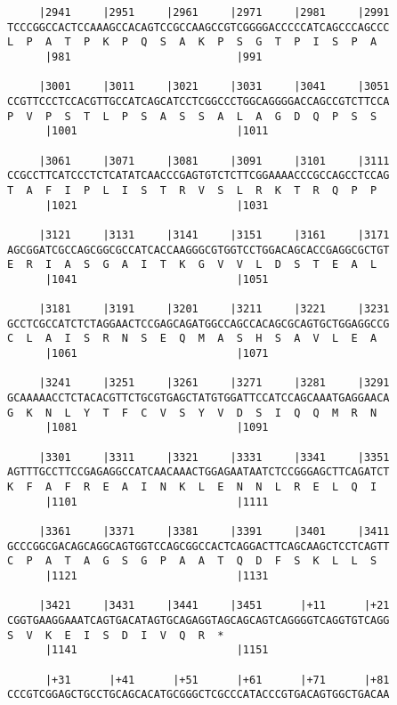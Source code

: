\documentclass{article}
\begin{document}
\begin{Verbatim}
     |2941     |2951     |2961     |2971     |2981     |2991
TCCCGGCCACTCCAAAGCCACAGTCCGCCAAGCCGTCGGGGACCCCCATCAGCCCAGCCC
L  P  A  T  P  K  P  Q  S  A  K  P  S  G  T  P  I  S  P  A  
      |981                          |991                    
  
     |3001     |3011     |3021     |3031     |3041     |3051
CCGTTCCCTCCACGTTGCCATCAGCATCCTCGGCCCTGGCAGGGGACCAGCCGTCTTCCA
P  V  P  S  T  L  P  S  A  S  S  A  L  A  G  D  Q  P  S  S  
      |1001                         |1011                   
  
     |3061     |3071     |3081     |3091     |3101     |3111
CCGCCTTCATCCCTCTCATATCAACCCGAGTGTCTCTTCGGAAAACCCGCCAGCCTCCAG
T  A  F  I  P  L  I  S  T  R  V  S  L  R  K  T  R  Q  P  P  
      |1021                         |1031                   
  
     |3121     |3131     |3141     |3151     |3161     |3171
AGCGGATCGCCAGCGGCGCCATCACCAAGGGCGTGGTCCTGGACAGCACCGAGGCGCTGT
E  R  I  A  S  G  A  I  T  K  G  V  V  L  D  S  T  E  A  L  
      |1041                         |1051                   
  
     |3181     |3191     |3201     |3211     |3221     |3231
GCCTCGCCATCTCTAGGAACTCCGAGCAGATGGCCAGCCACAGCGCAGTGCTGGAGGCCG
C  L  A  I  S  R  N  S  E  Q  M  A  S  H  S  A  V  L  E  A  
      |1061                         |1071                   
  
     |3241     |3251     |3261     |3271     |3281     |3291
GCAAAAACCTCTACACGTTCTGCGTGAGCTATGTGGATTCCATCCAGCAAATGAGGAACA
G  K  N  L  Y  T  F  C  V  S  Y  V  D  S  I  Q  Q  M  R  N  
      |1081                         |1091                   
  
     |3301     |3311     |3321     |3331     |3341     |3351
AGTTTGCCTTCCGAGAGGCCATCAACAAACTGGAGAATAATCTCCGGGAGCTTCAGATCT
K  F  A  F  R  E  A  I  N  K  L  E  N  N  L  R  E  L  Q  I  
      |1101                         |1111                   
  
     |3361     |3371     |3381     |3391     |3401     |3411
GCCCGGCGACAGCAGGCAGTGGTCCAGCGGCCACTCAGGACTTCAGCAAGCTCCTCAGTT
C  P  A  T  A  G  S  G  P  A  A  T  Q  D  F  S  K  L  L  S  
      |1121                         |1131                   
  
     |3421     |3431     |3441     |3451      |+11      |+21
CGGTGAAGGAAATCAGTGACATAGTGCAGAGGTAGCAGCAGTCAGGGGTCAGGTGTCAGG
S  V  K  E  I  S  D  I  V  Q  R  *   
      |1141                         |1151                   
  
      |+31      |+41      |+51      |+61      |+71      |+81
CCCGTCGGAGCTGCCTGCAGCACATGCGGGCTCGCCCATACCCGTGACAGTGGCTGACAA
                                                            

\end{Verbatim}
\end{document}
